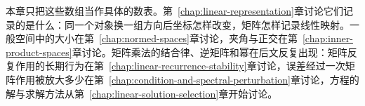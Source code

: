 本章只把这些数组当作具体的数表。第~\ref{chap:linear-representation}章讨论它们记录的是什么：同一个对象换一组方向后坐标怎样改变，矩阵怎样记录线性映射。一般空间中的大小在第~\ref{chap:normed-spaces}章讨论，夹角与正交在第~\ref{chap:inner-product-spaces}章讨论。矩阵乘法的结合律、逆矩阵和幂在后文反复出现：矩阵反复作用的长期行为在第~\ref{chap:linear-recurrence-stability}章讨论，误差经过一次矩阵作用被放大多少在第~\ref{chap:condition-and-spectral-perturbation}章讨论，方程的解与求解方法从第~\ref{chap:linear-solution-selection}章开始讨论。
